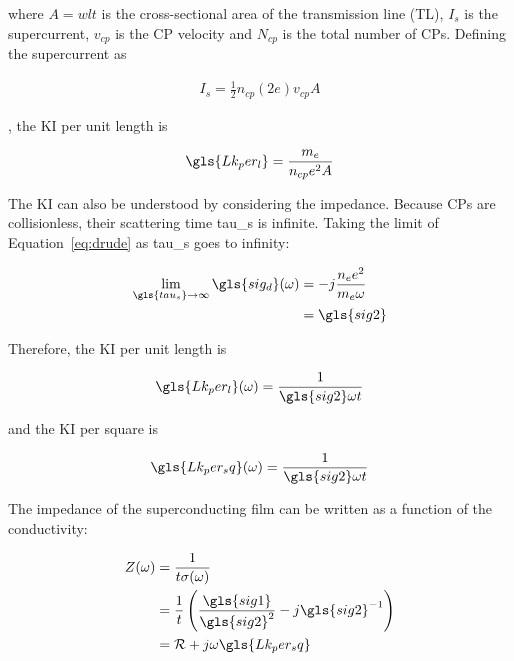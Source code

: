 where $A = wlt$ is the cross-sectional area of the transmission line (TL), $I_{s}$ is the supercurrent, $v_{cp}$ is the CP velocity and $N_{cp}$ is the total number of CPs. Defining the supercurrent as

\begin{equation}
  \begin{aligned}
  I_{s} = \frac{1}{2}n_{cp}(2e)v_{cp}A
  \end{aligned}
\end{equation}

, the KI per unit length is

\begin{equation} \label{eq:KI_per_length}
  \gls{Lk_per_l} = \frac{m_{e}}{n_{cp}e^{2}A}
\end{equation}

The KI can also be understood by considering the impedance. Because CPs are collisionless, their scattering time \gls{tau_s} is infinite. Taking the limit of Equation~\ref{eq:drude} as \gls{tau_s} goes to infinity:

\begin{equation}
    \begin{aligned}
    \lim_{\gls{tau_s} \to \infty} \gls{sig_d}(\omega) &= -j\frac{n_{e}e^{2}}{m_{e}\omega}\\
    &= \gls{sig2}
    \end{aligned}
\end{equation}

Therefore, the KI per unit length is

\begin{equation}
  \gls{Lk_per_l}(\omega) = \frac{1}{\gls{sig2}\omega t}
\end{equation}

and the KI per square is

\begin{equation}
  \gls{Lk_per_sq}(\omega) = \frac{1}{\gls{sig2}\omega t}
\end{equation}

The impedance of the superconducting film can be written as a function of the conductivity:

\begin{equation}\label{eq:Z}
  \begin{aligned}
  Z(\omega) &= \frac{1}{t\sigma(\omega)}\\
            &= \frac{1}{t}\left( \frac{\gls{sig1}}{\gls{sig2}^{2}} - j\gls{sig2}^{-1}\right)\\
            &= \mathcal{R} + j\omega\gls{Lk_per_sq}
  \end{aligned}
\end{equation}

